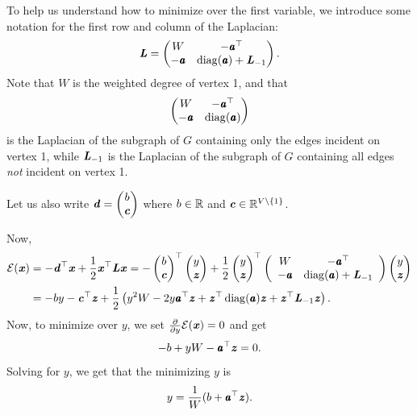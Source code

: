 To help us understand how to minimize over the first variable, we
introduce some notation for the first row and column of the Laplacian:
\begin{equation}
  \label{eq:lapuniformlayout}
  \LL =
\begin{pmatrix}
W & -\aa^\trp \\
-\aa& \diag(\aa) + \LL_{-1}
\end{pmatrix}.
\end{equation}
Note that $W$ is the weighted degree of vertex 1, and that
\begin{equation}
\begin{pmatrix}
W & -\pmb{\mathit{a}}^\top \\
-\pmb{\mathit{a}}& \operatorname*{diag}(\pmb{\mathit{a}})
\end{pmatrix}
\end{equation}
is the Laplacian of the subgraph of $G$ containing only the edges incident on
vertex 1, while $\boldsymbol{\mathit{L}}_{-1}$ is the Laplacian of the subgraph of $G$
containing all edges \emph{not} incident on vertex 1.

Let us also write $\boldsymbol{\mathit{d}} =
\begin{pmatrix}
  b \\ \boldsymbol{\mathit{c}}
\end{pmatrix}$ where $b \in \mathbb{R}$ and $\boldsymbol{\mathit{c}} \in \mathbb{R}^{V \setminus
  \left\{1 \right\}}$.

Now,
\begin{align*}
  \mathcal{E}(\boldsymbol{\mathit{x}})
  &=
  -\boldsymbol{\mathit{d}}^\top\boldsymbol{\mathit{x}} +
  \frac{1}{2}\boldsymbol{\mathit{x}}^\top\boldsymbol{\mathit{L}}\boldsymbol{\mathit{x}}
  =
  -\begin{pmatrix}
  b \\ \boldsymbol{\mathit{c}}
\end{pmatrix}^\top \begin{pmatrix}
  y \\ \boldsymbol{\mathit{z}}
\end{pmatrix}
+
  \frac{1}{2}\begin{pmatrix}
  y \\ \boldsymbol{\mathit{z}}
\end{pmatrix}^\top
\left(
\begin{array}{ccc}
W & -\pmb{\mathit{a}}^\top \\
-\pmb{\mathit{a}}& \operatorname*{diag}(\pmb{\mathit{a}}) + \boldsymbol{\mathit{L}}_{-1}
\end{array} \right)
\begin{pmatrix}
  y \\ \boldsymbol{\mathit{z}}
\end{pmatrix}
  \\
  &=
    - by  -\boldsymbol{\mathit{c}}^\top\boldsymbol{\mathit{z}}
    +
    \frac{1}{2}
    \left(
    y^2 W - 2 y \pmb{\mathit{a}}^\top \boldsymbol{\mathit{z}}
    +
    \boldsymbol{\mathit{z}}^\top \operatorname*{diag}(\pmb{\mathit{a}}) \boldsymbol{\mathit{z}}
    +
    \boldsymbol{\mathit{z}}^\top \boldsymbol{\mathit{L}}_{-1} \boldsymbol{\mathit{z}}
    \right).
\end{align*}
Now, to minimize over $y$, we set $\frac{\partial  }{\partial  y}
\mathcal{E}(\boldsymbol{\mathit{x}}) = 0$ and get
\[
    - b
    +
    y W - \pmb{\mathit{a}}^\top \boldsymbol{\mathit{z}}
    = 0
   .
  \]
  Solving for $y$, we get that the minimizing $y$ is
\begin{equation}
\label{eq:laponevarmin}
y = \frac{1}{W}(b + \aa^\trp \zz).
\end{equation}

